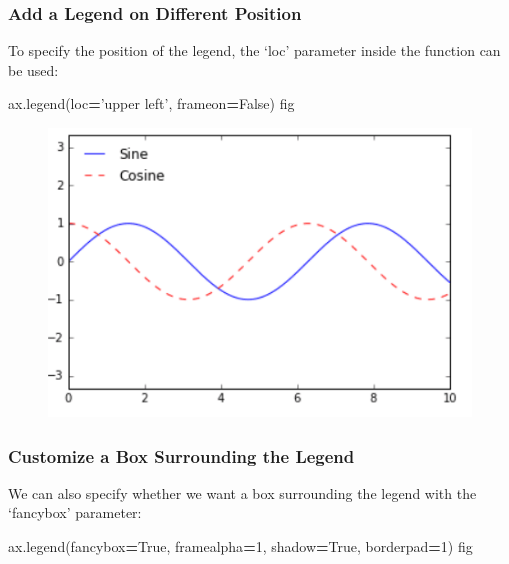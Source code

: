 \documentclass[]{book}
\newenvironment{Shaded}{\begin{snugshade}}{\end{snugshade}}
\newcommand{\DecValTok}[1]{\textcolor[rgb]{0.00,0.00,0.81}{#1}}
\newcommand{\StringTok}[1]{\textcolor[rgb]{0.31,0.60,0.02}{#1}}
\newcommand{\VariableTok}[1]{\textcolor[rgb]{0.00,0.00,0.00}{#1}}
\newcommand{\OperatorTok}[1]{\textcolor[rgb]{0.81,0.36,0.00}{\textbf{#1}}}
\newcommand{\NormalTok}[1]{#1}
\theoremstyle{definition}
\theoremstyle{definition}
\theoremstyle{definition}
\theoremstyle{remark}
\begin{document}
\subsubsection{Add a Legend on Different
Position}\label{add-a-legend-on-different-position}

To specify the position of the legend, the `loc' parameter inside the
function can be used:

\begin{Shaded}
\begin{Highlighting}[]
\NormalTok{ax.legend(loc}\OperatorTok{=}\StringTok{'upper left'}\NormalTok{, frameon}\OperatorTok{=}\VariableTok{False}\NormalTok{)}
\NormalTok{fig}
\end{Highlighting}
\end{Shaded}

\begin{figure}
\centering
\includegraphics{images/legend2.png}
\caption{}
\end{figure}

\subsubsection{Customize a Box Surrounding the
Legend}\label{customize-a-box-surrounding-the-legend}

We can also specify whether we want a box surrounding the legend with
the `fancybox' parameter:

\begin{Shaded}
\begin{Highlighting}[]
\NormalTok{ax.legend(fancybox}\OperatorTok{=}\VariableTok{True}\NormalTok{, framealpha}\OperatorTok{=}\DecValTok{1}\NormalTok{, shadow}\OperatorTok{=}\VariableTok{True}\NormalTok{, borderpad}\OperatorTok{=}\DecValTok{1}\NormalTok{)}
\NormalTok{fig}
\end{Highlighting}
\end{Shaded}
\end{document}
